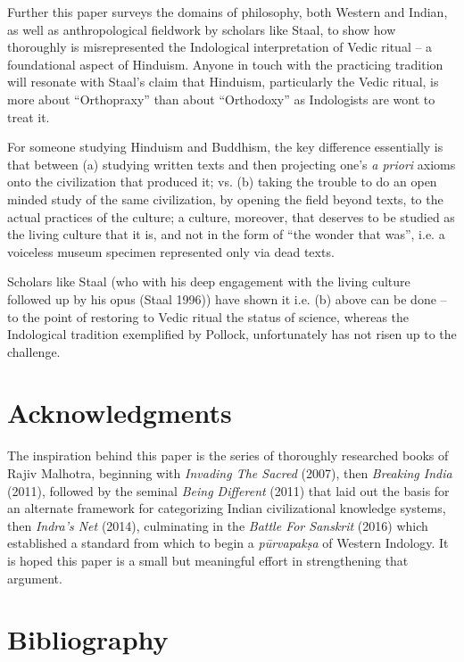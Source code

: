 Further this paper surveys the domains of philosophy, both Western and Indian, as well as anthropological fieldwork by scholars like Staal, to show how thoroughly is misrepresented the Indological interpretation of Vedic ritual – a foundational aspect of Hinduism. Anyone in touch with the practicing tradition will resonate with Staal’s claim that Hinduism, particularly the Vedic ritual, is more about “Orthopraxy” than about “Orthodoxy” as Indologists are wont to treat it.

For someone studying Hinduism and Buddhism, the key difference essentially is that between (a) studying written texts and then projecting one’s \textit{a priori} axioms onto the civilization that produced it; vs. (b) taking the trouble to do an open minded study of the same civilization, by opening the field beyond texts, to the actual practices of the culture; a culture, moreover, that deserves to be studied as the living culture that it is, and not in the form of “the wonder that was”, i.e. a voiceless museum specimen represented only via dead texts.

Scholars like Staal (who with his deep engagement with the living culture followed up by his opus (Staal 1996)) have shown it i.e. (b) above can be done – to the point of restoring to Vedic ritual the status of science, whereas the Indological tradition exemplified by Pollock, unfortunately has not risen up to the challenge.


\section*{Acknowledgments}

The inspiration behind this paper is the series of thoroughly researched books of Rajiv Malhotra, beginning with \textit{Invading The Sacred} (2007), then \textit{Breaking India} (2011), followed by the seminal \textit{Being Different} (2011) that laid out the basis for an alternate framework for categorizing Indian civilizational knowledge systems, then \textit{Indra’s Net} (2014), culminating in the \textit{Battle For Sanskrit} (2016) which established a standard from which to begin a \textit{pūrvapakṣa} of Western Indology. It is hoped this paper is a small but meaningful effort in strengthening that argument.


\section*{Bibliography}

